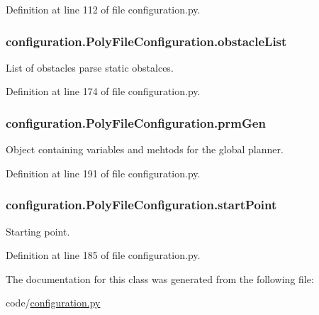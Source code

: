 Definition at line 112 of file configuration.\-py.

\hypertarget{classconfiguration_1_1PolyFileConfiguration_a4ea5eea95680f3bfdad4adce0578a0f0}{
\subsubsection[{obstacle\-List}]{\setlength{\rightskip}{0pt plus 5cm}configuration.\-Poly\-File\-Configuration.\-obstacle\-List}}\label{classconfiguration_1_1PolyFileConfiguration_a4ea5eea95680f3bfdad4adce0578a0f0}


List of obstacles parse static obstalces. 



Definition at line 174 of file configuration.\-py.

\hypertarget{classconfiguration_1_1PolyFileConfiguration_a075aa5177145a1041468f24e4829e8e8}{
\subsubsection[{prm\-Gen}]{\setlength{\rightskip}{0pt plus 5cm}configuration.\-Poly\-File\-Configuration.\-prm\-Gen}}\label{classconfiguration_1_1PolyFileConfiguration_a075aa5177145a1041468f24e4829e8e8}


Object containing variables and mehtods for the global planner. 



Definition at line 191 of file configuration.\-py.

\hypertarget{classconfiguration_1_1PolyFileConfiguration_ae5c780baacd4b800d1646a29a8608cbf}{
\subsubsection[{start\-Point}]{\setlength{\rightskip}{0pt plus 5cm}configuration.\-Poly\-File\-Configuration.\-start\-Point}}\label{classconfiguration_1_1PolyFileConfiguration_ae5c780baacd4b800d1646a29a8608cbf}


Starting point. 



Definition at line 185 of file configuration.\-py.



The documentation for this class was generated from the following file\-:\begin{DoxyCompactItemize}
\item 
code/\hyperlink{configuration_8py}{configuration.\-py}\end{DoxyCompactItemize}
